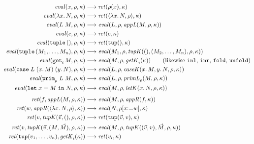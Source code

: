 \begin{align*}
  \mathit{eval}(x, \rho, \kappa) &\longrightarrow \mathit{ret}(\rho(x), \kappa) \\
  \mathit{eval}(\lambda x.\,N, \rho, \kappa) &\longrightarrow \mathit{ret}(\langle \lambda x.\,N, \rho\rangle, \kappa) \\
  \mathit{eval}(L\;M, \rho, \kappa) &\longrightarrow \mathit{eval}(L, \rho, \mathit{appL}(M, \rho, \kappa)) \\
  \mathit{eval}(c, \rho, \kappa) &\longrightarrow \mathit{ret}(c, \kappa) \\
  \mathit{eval}(\kw{tuple}\,(), \rho, \kappa) &\longrightarrow \mathit{ret}(\kw{tup}(), \kappa) \\
  \mathit{eval}(\kw{tuple}\,(M_1, \ldots, M_n), \rho, \kappa) &\longrightarrow \mathit{eval}(M_1, \rho, \mathit{tupK}((), (M_2, \ldots, M_n), \rho, \kappa)) \\
  \mathit{eval}(\kw{get}_i\,M, \rho, \kappa) &\longrightarrow \mathit{eval}(M, \rho, \mathit{getK}_i(\kappa))
    \qquad\text{(likewise $\kw{inl}$, $\kw{inr}$, $\kw{fold}$, $\kw{unfold}$)} \\
  \mathit{eval}(\kw{case}\;L\;(x.\,M)\;(y.\,N), \rho, \kappa) &\longrightarrow \mathit{eval}(L, \rho, \mathit{caseK}(x.\,M, y.\,N, \rho, \kappa)) \\
  \mathit{eval}(\kw{prim}_p\;L\;M, \rho, \kappa) &\longrightarrow \mathit{eval}(L, \rho, \mathit{primL}_p(M, \rho, \kappa)) \\
  \mathit{eval}(\kw{let}\;x = M\;\kw{in}\;N, \rho, \kappa) &\longrightarrow \mathit{eval}(M, \rho, \mathit{letK}(x.\,N, \rho, \kappa)) \\[4pt]
  \mathit{ret}(f, \mathit{appL}(M, \rho, \kappa)) &\longrightarrow \mathit{eval}(M, \rho, \mathit{appR}(f, \kappa)) \\
  \mathit{ret}(w, \mathit{appR}(\langle \lambda x.\,N, \rho\rangle, \kappa)) &\longrightarrow \mathit{eval}(N, \rho[x{:=}w], \kappa) \\
  \mathit{ret}(v, \mathit{tupK}(\vec{v}, (), \rho, \kappa)) &\longrightarrow \mathit{ret}(\kw{tup}(\vec{v}, v), \kappa) \\
  \mathit{ret}(v, \mathit{tupK}(\vec{v}, (M, \vec{M}), \rho, \kappa)) &\longrightarrow \mathit{eval}(M, \rho, \mathit{tupK}((\vec{v}, v), \vec{M}, \rho, \kappa)) \\
  \mathit{ret}(\kw{tup}(v_1, \ldots, v_n), \mathit{getK}_i(\kappa)) &\longrightarrow \mathit{ret}(v_i, \kappa) \\

\end{align*}
